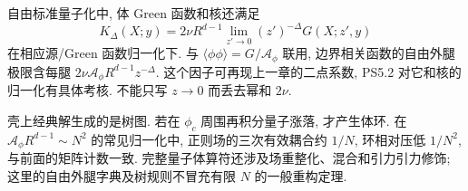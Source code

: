 自由标准量子化中, 体 Green 函数和核还满足
\[
K_\Delta(X;y)=2\nu R^{d-1}
\lim_{z'\to0}(z')^{-\Delta}G(X;z',y)
\]
在相应源/Green 函数归一化下. 与 $\langle\phi\phi\rangle=G/\mathcal A_\phi$ 联用, 边界相关函数的自由外腿极限含每腿 $2\nu\mathcal A_\phi R^{d-1}z^{-\Delta}$. 这个因子可再现上一章的二点系数, PS5.2 对它和核的归一化有具体考核. 不能只写 $z\to0$ 而丢去幂和 $2\nu$.

壳上经典解生成的是树图. 若在 $\phi_c$ 周围再积分量子涨落, 才产生体环. 在 $\mathcal A_\phi R^{d-1}\sim N^2$ 的常见归一化中, 正则场的三次有效耦合约 $1/N$, 环相对压低 $1/N^2$, 与前面的矩阵计数一致. 完整量子体算符还涉及场重整化、混合和引力引力修饰; 这里的自由外腿字典及树规则不冒充有限 $N$ 的一般重构定理.
